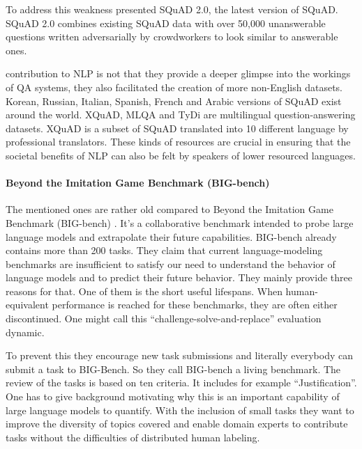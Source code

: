 \documentclass[
]{krantz}
\begin{document}
To address this weakness \citet{rajpurkar2018know} presented SQuAD 2.0, the latest version of SQuAD. SQuAD 2.0 combines existing SQuAD data with over 50,000 unanswerable questions written adversarially by crowdworkers to look similar to answerable ones.

\citet{rajpurkar2018know} contribution to NLP is not that they provide a deeper glimpse into the workings of QA systems, they also facilitated the creation of more non-English datasets. Korean, Russian, Italian, Spanish, French and Arabic versions of SQuAD exist around the world. XQuAD, MLQA and TyDi are multilingual question-answering datasets. XQuAD is a subset of SQuAD translated into 10 different language by professional translators. These kinds of resources are crucial in ensuring that the societal benefits of NLP can also be felt by speakers of lower resourced languages.

\hypertarget{beyond-the-imitation-game-benchmark-big-bench}{%
\paragraph{Beyond the Imitation Game Benchmark (BIG-bench)}\label{beyond-the-imitation-game-benchmark-big-bench}}

The mentioned ones are rather old compared to Beyond the Imitation Game Benchmark (BIG-bench) \citep{srivastava2022beyond}. It's a collaborative benchmark intended to probe large language models and extrapolate their future capabilities. BIG-bench already contains more than 200 tasks. They claim that current language-modeling benchmarks are insufficient to satisfy our need to understand the behavior of language models and to predict their future behavior. They mainly provide three reasons for that. One of them is the short useful lifespans. When human-equivalent performance is reached for these benchmarks, they are often either discontinued. One might call this ``challenge-solve-and-replace'' evaluation dynamic.

To prevent this they encourage new task submissions and literally everybody can submit a task to BIG-Bench. So they call BIG-bench a living benchmark. The review of the tasks is based on ten criteria. It includes for example ``Justification''. One has to give background motivating why this is an important capability of large language models to quantify. With the inclusion of small tasks they want to improve the diversity of topics covered and enable domain experts to contribute tasks without the difficulties of distributed human labeling.
\end{document}
